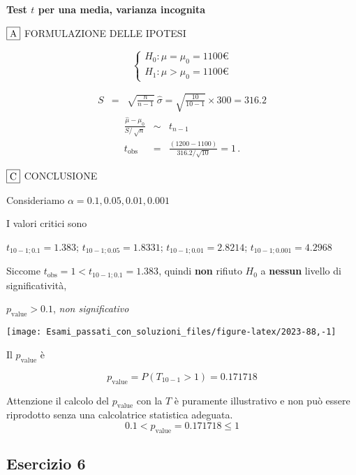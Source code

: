 \documentclass[
  11pt,
]{book}
\theoremstyle{mytheoremstyle}
\theoremstyle{mydefstyle}
\newenvironment{sol}
  {
  \begin{tcolorbox}[enhanced,breakable,arc=0.1mm,boxrule=1pt,colback=white,colframe=iblue,
  title=\bf \fontfamily{lmss}\selectfont \hspace{.5 cm} Soluzione,drop fuzzy shadow]

}{
\end{tcolorbox}
  }
\begin{document}
\begin{sol}
\textbf{Test \(t\) per una media, varianza incognita}

\(\fbox{A}\) FORMULAZIONE DELLE IPOTESI

\[\begin{cases}
   H_0: \mu = \mu_0=1100€ \\
   H_1: \mu > \mu_0=1100€ 
   \end{cases}\]

\begin{eqnarray*}
   S    &=& \sqrt{\frac{n} {n-1}}\ \widehat{\sigma} 
   =  \sqrt{\frac{ 10 } { 10 -1}} \times  300  =  316.2 
   \end{eqnarray*}
\begin{eqnarray*}
   \frac{\hat\mu - \mu_{0}} {S/\,\sqrt{n}}&\sim&t_{n-1}\\
   t_{\text{obs}}
   &=& \frac{ ( 1200 -  1100 )} { 316.2 /\sqrt{ 10 }}
   =   1 \, .
   \end{eqnarray*}

\(\fbox{C}\) CONCLUSIONE

Consideriamo \(\alpha=0.1, 0.05, 0.01, 0.001\)

I valori critici sono

\(t_{10-1;0.1}=1.383\); \(t_{10-1;0.05}=1.8331\); \(t_{10-1;0.01}=2.8214\); \(t_{10-1;0.001}=4.2968\)

Siccome \(t_\text{obs}=1<t_{10-1;0.1}=1.383\), quindi \textbf{non} rifiuto \(H_0\) a \textbf{nessun} livello di significatività,

\(p_\text{value}>0.1\), \emph{non significativo}

\begin{center}\texttt{[image: Esami\_passati\_con\_soluzioni\_files/figure-latex/2023-88,-1]} \end{center}

Il \(p_{\text{value}}\) è

\[ p_{\text{value}} = P(T_{10-1}>1)=0.171718 \]

Attenzione il calcolo del \(p_\text{value}\) con la \(T\) è puramente illustrativo e non può essere riprodotto senza una calcolatrice statistica adeguata.\[
 0.1 < p_\text{value}= 0.171718 \leq 1 
\]

\end{sol}

\subsection{Esercizio 6}\label{esercizio-6-28}
\end{document}
